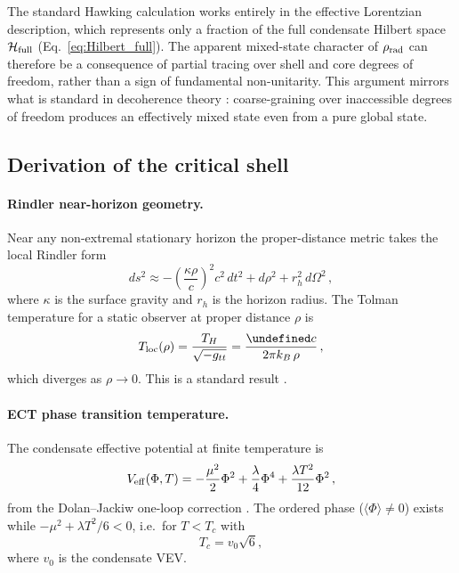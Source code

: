 \documentclass[11pt,a4paper]{article}
\let\hbar\undefined
\numberwithin{equation}{section}
\begin{document}
The standard Hawking calculation works entirely in the effective Lorentzian
description, which represents only a fraction of the full condensate Hilbert
space $\mathcal{H}_{\rm full}$ (Eq.~\eqref{eq:Hilbert_full}).
The apparent mixed-state character of $\rho_{\rm rad}$ can therefore be a
consequence of partial tracing over shell and core degrees of freedom, rather
than a sign of fundamental non-unitarity.
This argument mirrors what is standard in decoherence theory \cite{Zurek2003}:
coarse-graining over inaccessible degrees of freedom produces an effectively
mixed state even from a pure global state.

\subsection{Derivation of the critical shell}
\label{app:shell_derivation}

\paragraph{Rindler near-horizon geometry.}
Near any non-extremal stationary horizon the proper-distance metric takes the
local Rindler form
\begin{equation}
ds^2
\approx
-\!\left(\frac{\kappa\rho}{c}\right)^2\!c^2\,dt^2
+
d\rho^2
+
r_h^2\,d\Omega^2\,,
\end{equation}
where $\kappa$ is the surface gravity and $r_h$ is the horizon radius.
The Tolman temperature for a static observer at proper distance $\rho$ is
\begin{equation}
T_{\rm loc}(\rho)
=
\frac{T_H}{\sqrt{-g_{tt}}}
=
\frac{\hbar c}{2\pi k_B\,\rho}\,,
\label{eq:Tolman_app}
\end{equation}
which diverges as $\rho\to0$.
This is a standard result \cite{Unruh1976,BirrellDavies1982}.

\paragraph{ECT phase transition temperature.}
The condensate effective potential at finite temperature is
\begin{equation}
V_{\rm eff}(\Phi,T)
=
-\frac{\mu^2}{2}\Phi^2
+\frac{\lambda}{4}\Phi^4
+\frac{\lambda T^2}{12}\Phi^2\,,
\end{equation}
from the Dolan--Jackiw one-loop correction \cite{DolanJackiw1974}.
The ordered phase ($\langle\Phi\rangle\neq0$) exists while
$-\mu^2+\lambda T^2/6<0$, i.e.\ for $T<T_c$ with
\begin{equation}
  T_c = v_0\sqrt{6},
  \label{eq:Tc_value}
\end{equation}
where $v_0$ is the condensate VEV.
\end{document}
